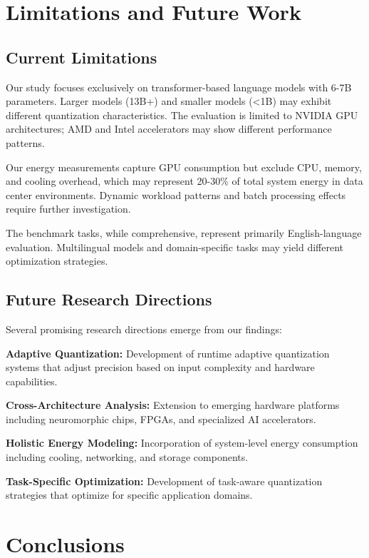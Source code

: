 \documentclass[sigconf,review]{acmart}
\begin{document}
\section{Limitations and Future Work}

\subsection{Current Limitations}

Our study focuses exclusively on transformer-based language models with 6-7B parameters. Larger models (13B+) and smaller models (<1B) may exhibit different quantization characteristics. The evaluation is limited to NVIDIA GPU architectures; AMD and Intel accelerators may show different performance patterns.

Our energy measurements capture GPU consumption but exclude CPU, memory, and cooling overhead, which may represent 20-30\% of total system energy in data center environments. Dynamic workload patterns and batch processing effects require further investigation.

The benchmark tasks, while comprehensive, represent primarily English-language evaluation. Multilingual models and domain-specific tasks may yield different optimization strategies.

\subsection{Future Research Directions}

Several promising research directions emerge from our findings:

\textbf{Adaptive Quantization:} Development of runtime adaptive quantization systems that adjust precision based on input complexity and hardware capabilities.

\textbf{Cross-Architecture Analysis:} Extension to emerging hardware platforms including neuromorphic chips, FPGAs, and specialized AI accelerators.

\textbf{Holistic Energy Modeling:} Incorporation of system-level energy consumption including cooling, networking, and storage components.

\textbf{Task-Specific Optimization:} Development of task-aware quantization strategies that optimize for specific application domains.

\section{Conclusions}
\end{document}
